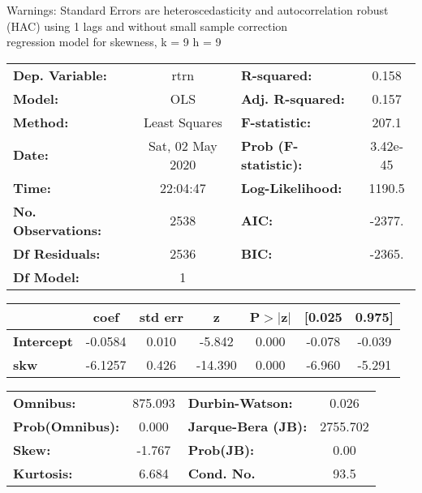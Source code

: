 Warnings: \newline
 [1] Standard Errors are heteroscedasticity and autocorrelation robust (HAC) using 1 lags and without small sample correction\\ 

regression model for skewness, k = 9 h = 9\begin{center}
\begin{tabular}{lclc}
\toprule
\textbf{Dep. Variable:}    &       rtrn       & \textbf{  R-squared:         } &     0.158   \\
\textbf{Model:}            &       OLS        & \textbf{  Adj. R-squared:    } &     0.157   \\
\textbf{Method:}           &  Least Squares   & \textbf{  F-statistic:       } &     207.1   \\
\textbf{Date:}             & Sat, 02 May 2020 & \textbf{  Prob (F-statistic):} &  3.42e-45   \\
\textbf{Time:}             &     22:04:47     & \textbf{  Log-Likelihood:    } &    1190.5   \\
\textbf{No. Observations:} &        2538      & \textbf{  AIC:               } &    -2377.   \\
\textbf{Df Residuals:}     &        2536      & \textbf{  BIC:               } &    -2365.   \\
\textbf{Df Model:}         &           1      & \textbf{                     } &             \\
\bottomrule
\end{tabular}
\begin{tabular}{lcccccc}
                   & \textbf{coef} & \textbf{std err} & \textbf{z} & \textbf{P$> |$z$|$} & \textbf{[0.025} & \textbf{0.975]}  \\
\midrule
\textbf{Intercept} &      -0.0584  &        0.010     &    -5.842  &         0.000        &       -0.078    &       -0.039     \\
\textbf{skw}       &      -6.1257  &        0.426     &   -14.390  &         0.000        &       -6.960    &       -5.291     \\
\bottomrule
\end{tabular}
\begin{tabular}{lclc}
\textbf{Omnibus:}       & 875.093 & \textbf{  Durbin-Watson:     } &    0.026  \\
\textbf{Prob(Omnibus):} &   0.000 & \textbf{  Jarque-Bera (JB):  } & 2755.702  \\
\textbf{Skew:}          &  -1.767 & \textbf{  Prob(JB):          } &     0.00  \\
\textbf{Kurtosis:}      &   6.684 & \textbf{  Cond. No.          } &     93.5  \\
\bottomrule
\end{tabular}
\end{center}

